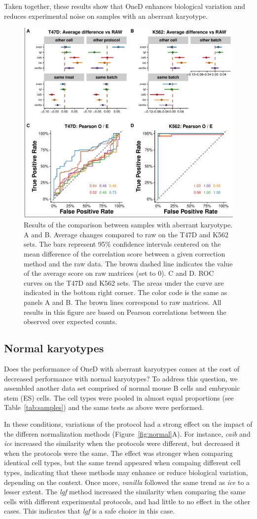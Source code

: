 \documentclass{bioinfo}
\begin{document}
Taken together, these results show that OneD enhances biological variation
and reduces experimental noise on samples with an aberrant karyotype.


\begin{figure}
\centerline{\includegraphics[width=.50\textwidth]{img/correlation_aberrant_figure3.pdf}}
\caption{
Results of the comparison between samples with aberrant karyotype. A and
B. Average changes compared to raw on the T47D and K562 sets. The bars
represent 95\% confidence intervals centered on the mean difference of the
correlation score between a given correction method and the raw data. The
brown dashed line indicates the value of the average score on raw matrices
(set to 0). C and D. ROC curves on the T47D and K562 sets. The areas under
the curve are indicated in the bottom right corner. The color code is the
same as panels A and B. The brown lines correspond to raw matrices. All
results in this figure are based on Pearson correlations between the
observed over expected counts.}
\label{fig:aberrant}
\end{figure}



\subsection{Normal karyotypes}

Does the performance of OneD with aberrant karyotypes comes at the cost of
decreased performance with normal karyotypes? To address this question, we
assembled another data set comprised of normal mouse B cells and embryonic
stem (ES) cells. The cell types were pooled in almost equal proportions
(see Table~\ref{tab:samples}) and the same tests as above were performed.

In these conditions, variations of the protocol had a strong effect on the
impact of the differen normalization methods (Figure~\ref{fig:normal}A).
For instance, \textit{caib} and \textit{ice} increased the similarity when
the protocols were different, but decreased it when the protocols were the
same. The effect was stronger when comparing identical cell types, but the
same trend appeared when compaing different cell types, indicating that
these methods may enhance or reduce biological variation, depending on the
context. Once more, \textit{vanilla} followed the same trend as
\textit{ice} to a lesser extent. The \textit{lgf} method increased the
similarity when comparing the same cells with different experimental
protocols, and had little to no effect in the other cases. This indicates
that \textit{lgf} is a safe choice in this case.
\end{document}
